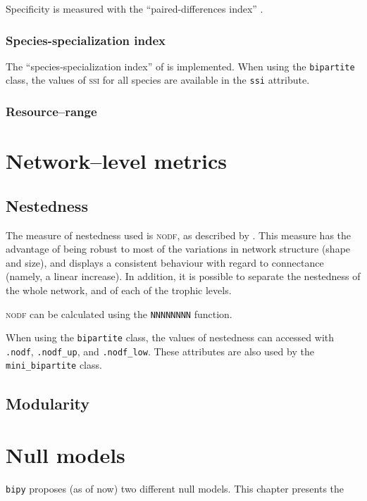 \documentclass[10pt]{scrbook}
\begin{document}
Specificity is measured with the ``paired-differences index'' \citep[\textsc{pdi},][]{PoisotMEE2011}. 

\subsection{Species-specialization index}

The ``species-specialization index'' of \citet{Julliard2006} is implemented. When using the  \texttt{bipartite} class, the values of \textsc{ssi} for all species are available in the \texttt{ssi} attribute.

\subsection{Resource--range}


\chapter{Network--level metrics}

\section{Nestedness}

The measure of nestedness used is \textsc{nodf}, as described by \citet{Almeida-Neto2008}. This measure has the advantage of being robust to most of the variations in network structure (shape and size), and displays a consistent behaviour with regard to connectance (namely, a linear increase). In addition, it is possible to separate the nestedness of the whole network, and of each of the trophic levels.

\textsc{nodf} can be calculated using the \texttt{NNNNNNNN} function.

When using the \texttt{bipartite} class, the values of nestedness can accessed with \texttt{.nodf}, \texttt{.nodf\_up}, and \texttt{.nodf\_low}. These attributes are also used by the \texttt{mini\_bipartite} class.

\section{Modularity}

\chapter{Null models}

\texttt{bipy} proposes (as of now) two different null models. This chapter presents the
\end{document}
